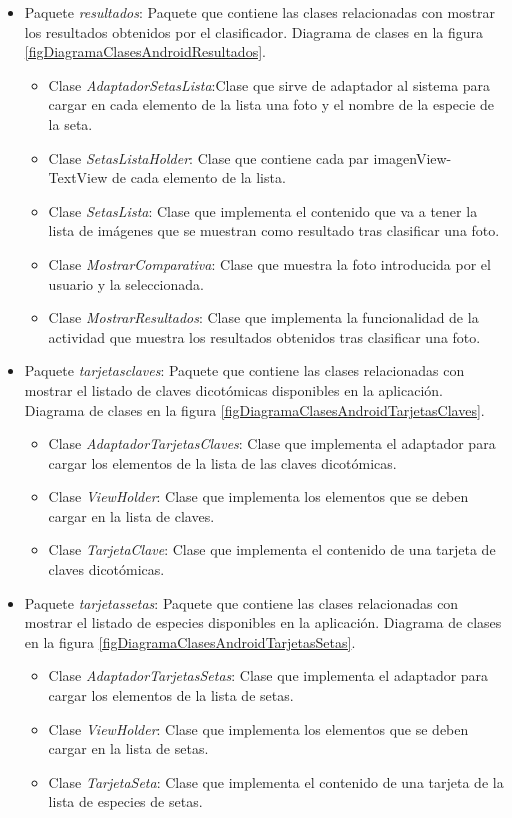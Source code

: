 \begin{itemize}
	\item Paquete \textit{resultados}: Paquete que contiene las clases relacionadas con mostrar los resultados obtenidos por el clasificador. Diagrama de clases en la figura \ref{figDiagramaClasesAndroidResultados}.
	\begin{itemize}
		\item Clase \textit{AdaptadorSetasLista}:Clase que sirve de adaptador al sistema para cargar en cada elemento de la lista una foto y el nombre de la especie de la seta.
		\item Clase \textit{SetasListaHolder}: Clase que contiene cada par imagenView-TextView de cada elemento de la lista.
		\item Clase \textit{SetasLista}: Clase que implementa el contenido que va a tener la lista de imágenes que se muestran como resultado tras clasificar una foto.
		\item Clase \textit{MostrarComparativa}: Clase que muestra la foto introducida por el usuario y la seleccionada.
		\item Clase \textit{MostrarResultados}: Clase que implementa la funcionalidad de la actividad que muestra los resultados obtenidos tras
clasificar una foto.
	\end{itemize}
	
	
	\item Paquete \textit{tarjetasclaves}: Paquete que contiene las clases relacionadas con mostrar el listado de claves dicotómicas disponibles en la aplicación. Diagrama de clases en la figura \ref{figDiagramaClasesAndroidTarjetasClaves}.
	\begin{itemize}
		\item Clase \textit{AdaptadorTarjetasClaves}: Clase que implementa el adaptador para cargar los elementos de la lista de las claves dicotómicas.
		\item Clase \textit{ViewHolder}: Clase que implementa los elementos que se deben cargar en la lista de claves.
		\item Clase \textit{TarjetaClave}: Clase que implementa el contenido de una tarjeta de claves dicotómicas.
	\end{itemize}
	
	
	\item Paquete \textit{tarjetassetas}: Paquete que contiene las clases relacionadas con mostrar el listado de especies disponibles en la aplicación. Diagrama de clases en la figura \ref{figDiagramaClasesAndroidTarjetasSetas}.
	\begin{itemize}
		\item Clase \textit{AdaptadorTarjetasSetas}: Clase que implementa el adaptador para cargar los elementos de la lista de setas.
		\item Clase \textit{ViewHolder}: Clase que implementa los elementos que se deben cargar en la lista de setas.
		\item Clase \textit{TarjetaSeta}: Clase que implementa el contenido de una tarjeta de la lista de especies de setas.
	\end{itemize}
	

\end{itemize}

